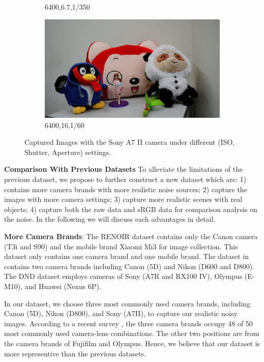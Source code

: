 \begin{figure}
\begin{subfigure}[t]{0.32\textwidth}
		\caption{6400,6.7,1/350}
    \end{subfigure}
    \hfill
    \begin{subfigure}[t]{0.32\textwidth}
        \centering
        \includegraphics[width=1\textwidth]{images/dataset/6400_16_1-60.jpg}
		\caption{6400,16,1/60}
    \end{subfigure}
    \caption{Captured Images with the Sony A7 II camera under different (ISO, Shutter, Aperture) settings.}
    \label{fig6-1}
\end{figure}


\textbf{Comparison With Previous Datasets}
To alleviate the limitations of the previous dataset, we propose to further construct a new dataset which are: 1) contains more camera brands with more realistic noise sources;  2) capture the images with more camera settings; 3) capture more realistic scenes with real objects; 4) capture both the raw data and sRGB data for comparison analysis on the noise. In the following we will discuss each advantages in detail.

\textbf{More Camera Brands}: The RENOIR dataset \cite{RENOIR2014} contains only the Canon camera (T3i and S90) and the mobile brand Xiaomi Mi3 for image collection. This dataset only contains one camera brand and one mobile brand. The dataset in \cite{crosschannel2016} contains two camera brands including Canon (5D) and Nikon (D600 and D800). The DND dataset \cite{dnd2017} employs cameras of Sony (A7R and RX100 IV),  Olympus (E-M10), and Huawei (Nexus 6P).

In our dataset, we choose three most commonly used camera brands, including Canon (5D), Nikon (D800), and Sony (A7II), to capture our realistic noisy images. According to a recent survey \cite{commoncamera}, the three camera brands occupy 48 of 50 most commonly used camera-lens combinations. The other two positions are from the camera brands of Fujifilm and Olympus. Hence, we believe that our dataset is more representive than the previous datasets.

